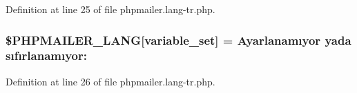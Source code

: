 Definition at line 25 of file phpmailer.\+lang-\/tr.\+php.

\subsubsection[{\texorpdfstring{\$\+P\+H\+P\+M\+A\+I\+L\+E\+R\+\_\+\+L\+A\+NG}{$PHPMAILER_LANG}}]{\setlength{\rightskip}{0pt plus 5cm}\$P\+H\+P\+M\+A\+I\+L\+E\+R\+\_\+\+L\+A\+NG\mbox{[}\textquotesingle{}variable\+\_\+set\textquotesingle{}\mbox{]} = \textquotesingle{}Ayarlanamıyor yada sıfırlanamıyor\+: \textquotesingle{}}\hypertarget{phpmailer_8lang-tr_8php_af795debc7a739d038742691c358d9032}{}\label{phpmailer_8lang-tr_8php_af795debc7a739d038742691c358d9032}


Definition at line 26 of file phpmailer.\+lang-\/tr.\+php.

